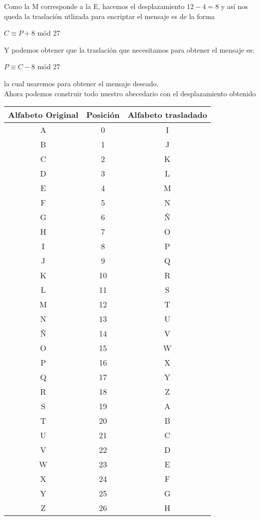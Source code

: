 \documentclass[12pt]{article}
\begin{document}
Como la M corresponde a la E, hacemos el desplazamiento $12 - 4 = 8$ y así nos queda la traslación utlizada para encriptar el mensaje es de la forma 
\begin{center}
    $C \equiv P + 8$ mód 27
\end{center} 

Y podemos obtener que la traslación que necesitamos para obtener el mensaje es:

\begin{center}
    $P \equiv C - 8$ mód 27
\end{center} 

la cual usaremos para obtener el mensaje deseado. \\

Ahora podemos construir todo nuestro abecedario con el desplazamiento obtenido 

\begin{center}
    \begin{tabular}{ |c|c|c|}
        \hline
            Alfabeto Original & Posición & Alfabeto trasladado \\
        \hline
        A & 0 & I \\
        B & 1 & J \\
        C & 2 & K \\
        D & 3 & L \\
        E & 4 & M \\
        F & 5 & N \\
        G & 6 & Ñ \\
        H & 7 & O \\
        I & 8 & P \\
        J & 9 & Q \\
        K & 10 & R \\ 
        L & 11 & S \\ 
        M & 12 & T \\ 
        N & 13 & U \\
        Ñ & 14 & V \\
        O & 15 & W \\
        P & 16 & X \\
        Q & 17 & Y \\
        R & 18 & Z \\
        S & 19 & A \\
        T & 20 & B \\
        U & 21 & C \\
        V & 22 & D \\
        W & 23 & E \\
        X & 24 & F \\
        Y & 25 & G \\
        Z & 26 & H \\
        \hline 
    \end{tabular}
\end{center}
\end{document}
